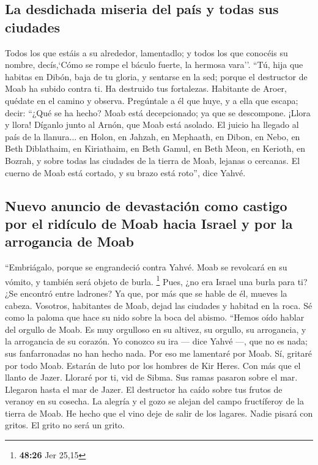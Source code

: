 \begin{paracol}{2}
\hypertarget{la-desdichada-miseria-del-pauxeds-y-todas-sus-ciudades}{%
\subsection{La desdichada miseria del país y todas sus
ciudades}\label{la-desdichada-miseria-del-pauxeds-y-todas-sus-ciudades}}

 Todos los que estáis a su alrededor, lamentadlo; y todos
los que conocéis su nombre, decís,`Cómo se rompe el báculo fuerte, la
hermosa vara''.  ``Tú, hija que habitas en Dibón, baja de
tu gloria, y sentarse en la sed; porque el destructor de Moab ha subido
contra ti. Ha destruido tus fortalezas.  Habitante de
Aroer, quédate en el camino y observa. Pregúntale a él que huye, y a
ella que escapa; decir: ``¿Qué se ha hecho?  Moab está
decepcionado; ya que se descompone. ¡Llora y llora! Díganlo junto al
Arnón, que Moab está asolado.  El juicio ha llegado al
país de la llanura... en Holon, en Jahzah, en Mephaath, 
en Dibon, en Nebo, en Beth Diblathaim,  en Kiriathaim, en
Beth Gamul, en Beth Meon,  en Kerioth, en Bozrah, y sobre
todas las ciudades de la tierra de Moab, lejanas o cercanas.
 El cuerno de Moab está cortado, y su brazo está roto'',
dice Yahvé.

\hypertarget{nuevo-anuncio-de-devastaciuxf3n-como-castigo-por-el-riduxedculo-de-moab-hacia-israel-y-por-la-arrogancia-de-moab}{%
\subsection{Nuevo anuncio de devastación como castigo por el ridículo de
Moab hacia Israel y por la arrogancia de
Moab}\label{nuevo-anuncio-de-devastaciuxf3n-como-castigo-por-el-riduxedculo-de-moab-hacia-israel-y-por-la-arrogancia-de-moab}}

 ``Embriágalo, porque se engrandeció contra Yahvé. Moab
se revolcará en su vómito, y también será objeto de burla. \footnote{\textbf{48:26}
  Jer 25,15}  Pues, ¿no era Israel una burla para ti? ¿Se
encontró entre ladrones? Ya que, por más que se hable de él, mueves la
cabeza.  Vosotros, habitantes de Moab, dejad las ciudades
y habitad en la roca. Sé como la paloma que hace su nido sobre la boca
del abismo.  ``Hemos oído hablar del orgullo de Moab. Es
muy orgulloso en su altivez, su orgullo, su arrogancia, y la arrogancia
de su corazón.  Yo conozco su ira --- dice Yahvé ---, que
no es nada; sus fanfarronadas no han hecho nada.  Por eso
me lamentaré por Moab. Sí, gritaré por todo Moab. Estarán de luto por
los hombres de Kir Heres.  Con más que el llanto de
Jazer. Lloraré por ti, vid de Sibma. Sus ramas pasaron sobre el mar.
Llegaron hasta el mar de Jazer. El destructor ha caído sobre tus frutos
de veranoy en su cosecha.  La alegría y el gozo se alejan
del campo fructíferoy de la tierra de Moab. He hecho que el vino deje de
salir de los lagares. Nadie pisará con gritos. El grito no será un
grito.


\end{paracol}
